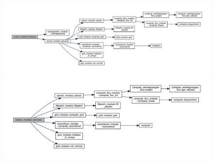 \documentclass[11pt]{article}
\begin{document}
\begin{figure}
\includegraphics[scale=0.5]{evolve_mod_timestep.pdf}
\includegraphics[scale=0.5]{evolve_mod_advance.pdf}
\end{figure}



\newpage	


\end{document}
